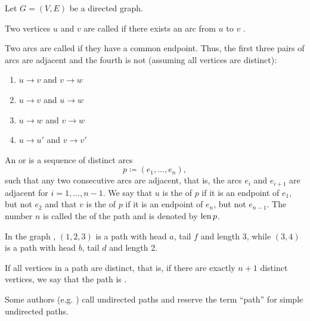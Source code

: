 \begin{definition}\label{def:graph_paths}
  Let \( G = (V, E) \) be a directed graph.

  \begin{thmenum}
     Two vertices \( u \)  and \( v \)  are called  if there exists an arc from \( u \)  to \( v \) .

     Two arcs are called  if they have a common endpoint. Thus, the first three pairs of arcs are adjacent and the fourth is not (assuming all vertices are distinct):
    \begin{enumerate}
      \item \( u \to v \) and \( v \to w \)
      \item \( u \to v \) and \( u \to w \)
      \item \( u \to w \) and \( v \to w \)
      \item \( u \to u' \) and \( v \to v' \)
    \end{enumerate}

     An  or  is a sequence of distinct arcs
    \begin{equation*}
      p \coloneqq ( e_1, \ldots, e_n ),
    \end{equation*}
    such that any two consecutive arcs are adjacent, that is, the arcs \( e_i \) and \( e_{i+1} \) are adjacent for \( i = 1, \ldots, n - 1 \). We say that \( u \) is the  of \( p \) if it is an endpoint of \( e_1 \), but not \( e_2 \) and that \( v \) is the  of \( p \) if it is an endpoint of \( e_n \), but not \( e_{n-1} \). The number \( n \) is called the  of the path and is denoted by \( \operatorname{len} p \).

    In the graph , \( (1, 2, 3) \) is a path with head \( a \), tail \( f \) and length 3, while \( (3, 4) \) is a path with head \( b \), tail \( d \) and length 2.

    If all vertices in a path are distinct, that is, if there are exactly \( n + 1 \) distinct vertices, we say that the path is .

    Some authors (e.g. \cite[sec. 5.2]{Erickson2019}) call undirected paths  and reserve the term \enquote{path} for simple undirected paths.


\end{thmenum}
\end{definition}
